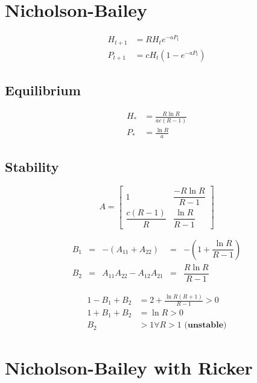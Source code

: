 \documentclass{article}
\begin{document}
\newcommand{\pn}[1]{\left(#1\right)}

\section{Nicholson-Bailey}
\begin{align*}
    H_{t+1} &= R H_t e^{-a P_t}\\
    P_{t+1} &= c H_t \pn{1 - e^{-a P_t}}
\end{align*}

\subsection{Equilibrium}
\begin{align*}
    H_* &= \frac{R \ln{R}}{a c \pn{R-1}}\\
    P_* &= \frac{\ln R}{a}
\end{align*}

\subsection{Stability}
\begin{equation*}
    A = \left[ \begin{array}{ll}
    1 & \dfrac{-R \ln{R}}{R-1}\\
    \dfrac{c\pn{R-1}}{R} & \dfrac{\ln{R}}{R-1}
    \end{array} \right]
\end{equation*}

\begin{equation*}
\begin{array}{lclcl}
B_1 &=& -\pn{A_{11}+A_{22}}  &=& -\pn{1+\dfrac{\ln{R}}{R-1}} \\
B_2 &=& A_{11}A_{22}-A_{12}A_{21} &=& \dfrac{R\ln{R}}{R-1} 
\end{array}
\end{equation*}

\begin{align*}
1 - B_1 + B_2 &= 2 + \frac{\ln{R}\pn{R+1}}{R-1} > 0\\
1 + B_1 + B_2 &= \ln{R} > 0\\
B_2 &> 1 \forall R > 1 \textbf{ (unstable)}
\end{align*}



\pagebreak
\section{Nicholson-Bailey with Ricker}
\end{document}
